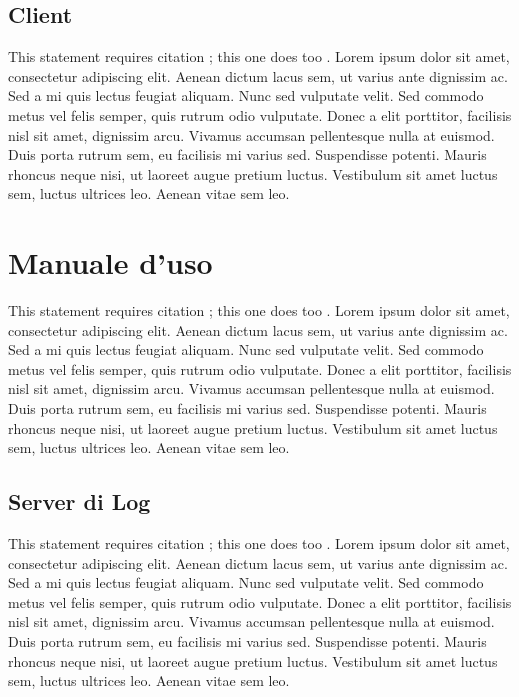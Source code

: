 \documentclass[a4paper, 11pt]{article} %
\begin{document}
\subsection{Client}

This statement requires citation \cite{Smith:2012qr}; this one does too \cite{Smith:2013jd}. Lorem ipsum dolor sit amet, consectetur adipiscing elit. Aenean dictum lacus sem, ut varius ante dignissim ac. Sed a mi quis lectus feugiat aliquam. Nunc sed vulputate velit. Sed commodo metus vel felis semper, quis rutrum odio vulputate. Donec a elit porttitor, facilisis nisl sit amet, dignissim arcu. Vivamus accumsan pellentesque nulla at euismod. Duis porta rutrum sem, eu facilisis mi varius sed. Suspendisse potenti. Mauris rhoncus neque nisi, ut laoreet augue pretium luctus. Vestibulum sit amet luctus sem, luctus ultrices leo. Aenean vitae sem leo.


\newpage
\section{Manuale d'uso}

This statement requires citation \cite{Smith:2012qr}; this one does too \cite{Smith:2013jd}. Lorem ipsum dolor sit amet, consectetur adipiscing elit. Aenean dictum lacus sem, ut varius ante dignissim ac. Sed a mi quis lectus feugiat aliquam. Nunc sed vulputate velit. Sed commodo metus vel felis semper, quis rutrum odio vulputate. Donec a elit porttitor, facilisis nisl sit amet, dignissim arcu. Vivamus accumsan pellentesque nulla at euismod. Duis porta rutrum sem, eu facilisis mi varius sed. Suspendisse potenti. Mauris rhoncus neque nisi, ut laoreet augue pretium luctus. Vestibulum sit amet luctus sem, luctus ultrices leo. Aenean vitae sem leo.

\subsection{Server di Log}

This statement requires citation \cite{Smith:2012qr}; this one does too \cite{Smith:2013jd}. Lorem ipsum dolor sit amet, consectetur adipiscing elit. Aenean dictum lacus sem, ut varius ante dignissim ac. Sed a mi quis lectus feugiat aliquam. Nunc sed vulputate velit. Sed commodo metus vel felis semper, quis rutrum odio vulputate. Donec a elit porttitor, facilisis nisl sit amet, dignissim arcu. Vivamus accumsan pellentesque nulla at euismod. Duis porta rutrum sem, eu facilisis mi varius sed. Suspendisse potenti. Mauris rhoncus neque nisi, ut laoreet augue pretium luctus. Vestibulum sit amet luctus sem, luctus ultrices leo. Aenean vitae sem leo.
\end{document}
